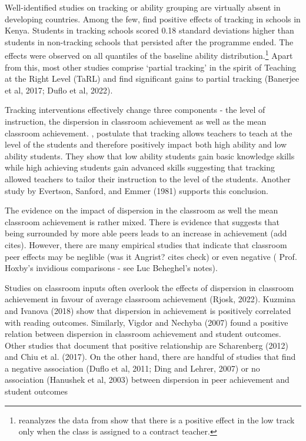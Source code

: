 \documentclass[11pt]{article}
\begin{document}
Well-identified studies on tracking or ability grouping are virtually absent in developing countries.  Among the few, \cite{duflodupaskremer} find positive effects of tracking in schools in Kenya. Students in tracking schools scored 0.18 standard deviations higher than students in non-tracking schools that persisted after the programme ended. The effects were observed on all quantiles of the baseline ability distribution.\footnote{\cite{cummins2017heterogeneous} reanalyzes the data from  \cite{duflodupaskremer} show that there is a positive effect in the low track only when the class is assigned to a contract teacher.} Apart from this, most other studies comprise ‘partial tracking’ in the spirit of Teaching at the Right Level (TaRL) and find significant gains to partial tracking (Banerjee et al, 2017; Duflo et al, 2022). 

Tracking interventions effectively change three components - the level of instruction, the dispersion in classroom achievement as well as the mean classroom achievement.  \cite{duflodupaskremer}, postulate that tracking allows teachers to teach at the level of the students and therefore positively impact both high ability and low ability students. They show that low ability students gain basic knowledge skills while high achieving students gain advanced skills suggesting that tracking allowed teachers to tailor their instruction to the level of the students. Another study by Evertson, Sanford, and Emmer (1981) supports this conclusion.  

The evidence on the impact of dispersion in the classroom as well the mean classroom achievement is rather mixed. There is evidence that suggests that being surrounded by more able peers leads to an increase in achievement (add cites). However, there are many empirical studies that indicate that classroom peer effects may be neglible (was it Angrist? cites check) or even negative ( Prof. Hoxby's invidious comparisons - see Luc Beheghel's notes).

Studies on classroom inputs often overlook the effects of dispersion in classroom achievement in favour of average classroom achievement (Rjosk, 2022). Kuzmina and Ivanova (2018) show that dispersion in achievement is positively correlated with reading outcomes. Similarly, Vigdor and Nechyba (2007) found a positive relation between dispersion in classroom achievement and student outcomes. Other studies that document that positive relationship are Scharenberg (2012) and  Chiu et al. (2017). On the other hand, there are handful of studies that find a negative association  (Duflo et al, 2011; Ding and Lehrer, 2007) or no association (Hanushek et al, 2003) between dispersion in peer achievement and student outcomes
\end{document}

